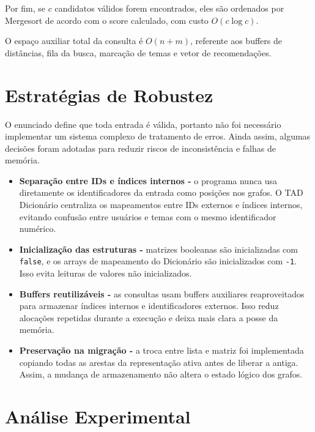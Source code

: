 \documentclass[12pt,a4paper]{article}
\begin{document}
Por fim, se $c$ candidatos válidos forem encontrados, eles são ordenados por Mergesort
de acordo com o score calculado, com custo $O(c \log c)$. 

O espaço auxiliar total da
consulta é $O(n + m)$, referente aos buffers de distâncias, fila da busca, marcação de
temas e vetor de recomendações.

\section{Estratégias de Robustez}

O enunciado define que toda entrada é válida, portanto não foi necessário
implementar um sistema complexo de tratamento de erros. Ainda assim, algumas decisões
foram adotadas para reduzir riscos de inconsistência e falhas de memória.

\begin{itemize}
    \item \textbf{Separação entre IDs e índices internos -} o programa nunca usa diretamente
    os identificadores da entrada como posições nos grafos. O TAD Dicionário centraliza
    os mapeamentos entre IDs externos e índices internos, evitando confusão entre usuários
    e temas com o mesmo identificador numérico.

    \item \textbf{Inicialização das estruturas -} matrizes booleanas são inicializadas com
    \texttt{false}, e os arrays de mapeamento do Dicionário são inicializados com
    \texttt{-1}. Isso evita leituras de valores não inicializados.

    \item \textbf{Buffers reutilizáveis -} as consultas usam buffers auxiliares reaproveitados
    para armazenar índices internos e identificadores externos. Isso reduz alocações
    repetidas durante a execução e deixa mais clara a posse da memória.

    \item \textbf{Preservação na migração -} a troca entre lista e matriz foi implementada
    copiando todas as arestas da representação ativa antes de liberar a antiga. Assim, a
    mudança de armazenamento não altera o estado lógico dos grafos.
    
\end{itemize}

\section{Análise Experimental}
\end{document}
